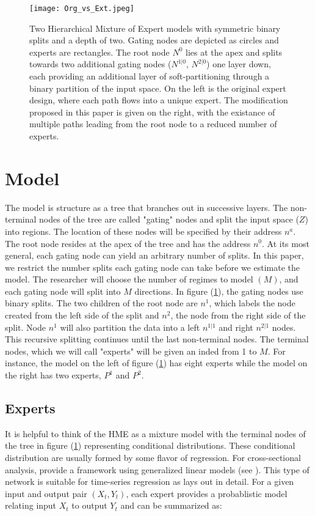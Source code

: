 \documentclass[12pt]{article}
\begin{document}
\begin{figure}[ht]
  \centering
  \texttt{[image: Org\_vs\_Ext.jpeg]}
  \caption{Two Hierarchical Mixture of Expert models with symmetric
  binary splits and a depth of two. Gating nodes are depicted as circles
  and experts are rectangles. The root node $N^{0}$ lies at the apex and
  splits towards two additional gating nodes ($N^{1|0}$, $N^{2|0}$) one layer
  down, each providing an  additional layer of soft-partitioning through a
  binary partition of the input space. On the left is the original expert
  design, where each path flows into a unique expert. The modification
  proposed in this paper is given on the right, with the existance of multiple
  paths leading from the root node to a reduced number of experts.}
  \label{fig:HMEcomparison}
\end{figure}


\section{Model}

The model is structure as a tree that branches out in successive
layers. The non-terminal nodes of the tree are called "gating" nodes and
split the input space ($Z$) into regions. The location of these nodes will be
specified by their address $n^{a}$. The root node resides at the apex of the tree
and has the address $n^{0}$. At its most general, each gating node can yield an
arbitrary number of splits. In this paper, we restrict the number splits each
gating node can take before we estimate the model. The researcher will choose the
number of regimes to model $(M)$, and each gating node will split into $M$
directions. In figure (\ref{fig:HMEcomparison}), the gating nodes use binary
splits. The two children of the root node are $n^{1}$, which labels the
node created from the left side of the split and $n^{2}$, the node from
the right side of the split. Node $n^{1}$ will also partition the data
into a left $n^{1|1}$ and right $n^{2|1}$ nodes. This recursive splitting
continues until the last non-terminal nodes. The terminal nodes, which we will
call "experts" will be given an inded from 1 to $M$. For instance, the model on 
the left of figure (\ref{fig:HMEcomparison}) has eight experts while the model on
the right has two experts, $P^{1}$ and $P^{2}$.





\subsection{Experts}
It is helpful to think of the HME as a mixture model with the terminal
nodes of the tree in figure (\ref{fig:HMEcomparison}) representing conditional
distributions. These conditional distribution are usually formed by some flavor of
regression. For cross-sectional analysis, \cite{JordanJacobs1993} provide
a framework using generalized linear models (see \cite{GLM1972}). This type
of network is suitable for time-series regression as \cite{HuertaJiangTanner2003}
lays out in detail. For a given input and output pair $(X_{t}, Y_{t})$,
each expert provides a probablistic model relating input $X_{t}$ to output
$Y_{t}$ and can be summarized as:
\end{document}
